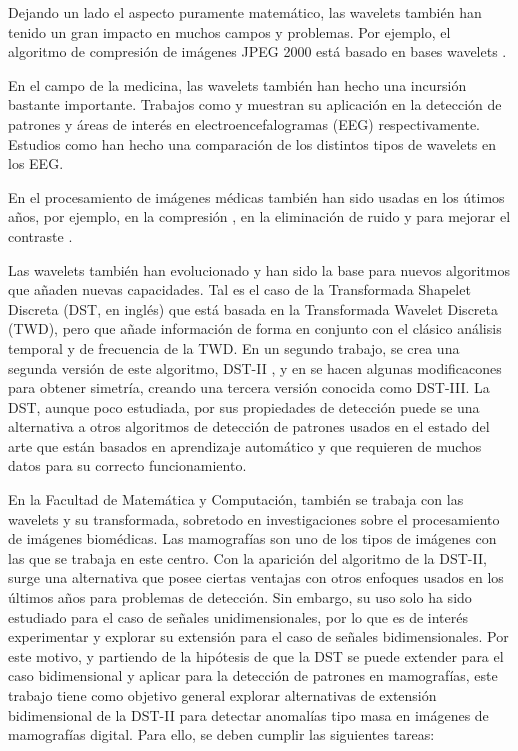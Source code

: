 Dejando un lado el aspecto puramente matemático, las wavelets también han tenido un gran impacto  
en muchos campos y problemas. Por ejemplo, el algoritmo de compresión de imágenes JPEG 2000 está basado en
bases wavelets \cite{Taubman2002}.

En el campo de la medicina, las wavelets también han hecho una incursión bastante importante. Trabajos como
\cite{Bhattacharyya2018} y \cite{Sharma2020} muestran su aplicación en la detección de patrones y áreas de interés
en electroencefalogramas (EEG) respectivamente. Estudios como \cite{Too2018} han hecho una comparación de los distintos
tipos de wavelets en los EEG. 

En el procesamiento de imágenes médicas también han sido 
usadas en los útimos años, por ejemplo, en la compresión \cite{Bruylants2015}\cite{Alkinani2021}, en la eliminación de ruido
 \cite{Wang2006}\cite{George2016}\cite{Patil2021} y para 
mejorar el contraste \cite{Dikshit2022}.

Las wavelets también han evolucionado y han sido la base para nuevos algoritmos que añaden nuevas capacidades.
Tal es el caso de la Transformada Shapelet Discreta (DST, en inglés) \cite{Guido2008} que está basada en la Transformada 
Wavelet Discreta (TWD), pero que añade información de forma en conjunto con el clásico análisis temporal y de frecuencia de la
TWD. En un segundo trabajo, se crea una segunda versión de este algoritmo, DST-II \cite{Guido2018}, y en \cite{Guido2021} se hacen 
algunas modificacones para obtener simetría, creando una tercera versión conocida como DST-III.
La DST, aunque poco estudiada, por sus propiedades de detección puede se una alternativa a otros algoritmos de
detección de patrones usados en el estado del arte que están basados en aprendizaje automático y que requieren
de muchos datos para su correcto funcionamiento.

En la Facultad de Matemática y Computación, también se trabaja con las wavelets y su transformada, sobretodo en
investigaciones sobre el procesamiento de imágenes biomédicas. Las mamografías son uno de los tipos de imágenes
con las que se trabaja en este centro. 
Con la aparición del algoritmo de la DST-II, surge  
una alternativa que posee ciertas ventajas con otros enfoques  
usados en los últimos años para problemas de detección. Sin embargo, su uso solo ha sido estudiado para el 
caso de señales unidimensionales, por lo que es de interés experimentar y explorar su extensión
para el caso de señales bidimensionales. Por este motivo, y partiendo de la hipótesis de que la DST se 
puede extender para el caso bidimensional y aplicar para la detección de patrones en mamografías, este trabajo tiene como 
objetivo general explorar alternativas de extensión bidimensional de la DST-II para detectar 
anomalías tipo masa en imágenes de mamografías digital. Para ello, se deben cumplir las 
siguientes tareas:

